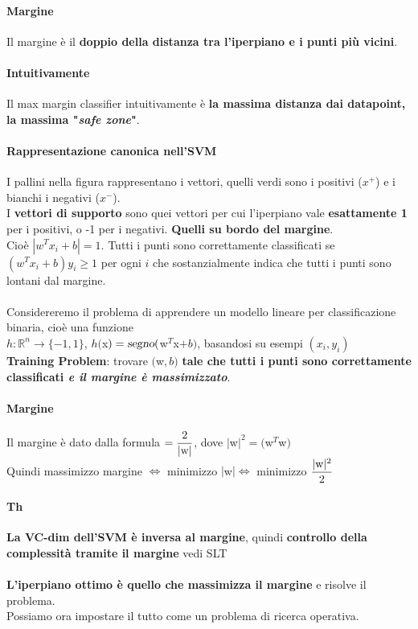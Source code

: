 \documentclass[10pt]{book}
\begin{document}
\paragraph{Margine} Il margine è il \textbf{doppio della distanza tra l'iperpiano e i punti più vicini}.
\paragraph{Intuitivamente} Il max margin classifier intuitivamente è \textbf{la massima distanza dai datapoint, la massima "\textit{safe zone}"}.
\paragraph{Rappresentazione canonica nell'SVM} I pallini nella figura rappresentano i vettori, quelli verdi sono i positivi ($x^+$) e i bianchi i negativi ($x^-$).\\
I \textbf{vettori di supporto} sono quei vettori per cui l'iperpiano vale \textbf{esattamente 1} per i positivi, o -1 per i negativi. \textbf{Quelli su bordo del margine}.\\Cioè $|w^Tx_i + b| = 1$. Tutti i punti sono correttamente classificati se $(w^Tx_i + b)y_i \geq 1$ per ogni $i$ che sostanzialmente indica che tutti i punti sono lontani dal margine.\\\\
Considereremo il problema di apprendere un modello lineare per classificazione binaria, cioè una funzione\\$h : \mathbb{R}^n \rightarrow \{-1, 1\}$, $h($x$) = \textsl{segno}($w$^T$x$ + b)$, basandosi su esempi $(x_i, y_i)$\\
\textbf{Training Problem}: trovare $($w$, b)$ \textbf{tale che tutti i punti sono correttamente classificati \textit{e il margine è massimizzato}}.
\paragraph{Margine} Il margine è dato dalla formula $= \mathlarger{\frac{2}{|\text{w}|}}$, dove $|$w$|^2 = ($w$^T$w$)$\\
Quindi massimizzo margine $\Leftrightarrow$ minimizzo $|$w$| \Leftrightarrow$ minimizzo $\mathlarger{\frac{|\text{w}|^2}{2}}$
\paragraph{Th} \textbf{La VC-dim dell'SVM è inversa al margine}, quindi \textbf{controllo della complessità tramite il margine} vedi SLT\\\\
\textbf{L'iperpiano ottimo è quello che massimizza il margine} e risolve il problema.\\
Possiamo ora impostare il tutto come un problema di ricerca operativa.
\end{document}
